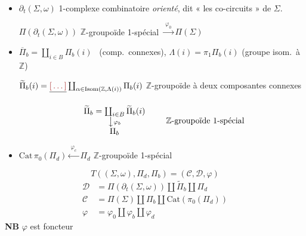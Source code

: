 \documentclass[11pt,a4paper]{article}
\begin{document}
\begin{itemize}
  \item[(a')] $\partial_t(\Sigma, \omega)$ 1-complexe combinatoire
  \struck{\ill{}} \emph{orienté}, dit « les co-circuits » de $\Sigma$.

  $\Pi(\partial_t(\Sigma, \omega))$ \quad $\mathbb{Z}$-groupoïde 1-spécial
  $\xrightarrow{\ \varphi_0\ } \Pi(\Sigma)$

  \item[(b')]
  $\overline{\Pi}_b = \coprod_{i \in B} \Pi_b(i)$ \ (comp.\ connexes),
  \quad $\Lambda(i) = \pi_1 \Pi_b(i)$ (groupe isom.\ à $\mathbb{Z}$)

  $\widetilde{\Pi}_b(i) = \struck{\ill{}} \coprod_{\alpha \in \mathrm{Isom}(\mathbb{Z}, \Lambda(i))}
  \Pi_b(i)$ \quad $\mathbb{Z}$-groupoïde  à deux
  composantes connexes

  \[
    \begin{array}{c}
      \widetilde{\Pi}_b = \coprod_{i \in B} \widetilde{\Pi}_b(i) \\
      \big\downarrow \scriptstyle \varphi_b \\
      \Pi_b
    \end{array}
    \qquad \mathbb{Z}\text{-groupoïde 1-spécial}
  \]

  \item[(c')] $\mathrm{Cat}\, \pi_0(\Pi_d) \xleftarrow{\ \varphi_c\ } \Pi_d$
  \quad $\mathbb{Z}$-groupoïde 1-spécial
\end{itemize}

\[
  T((\Sigma, \omega), \Pi_d, \Pi_b) = (\mathcal{C}, \mathcal{D}, \varphi)
\]
\[
  \begin{aligned}
    \mathcal{D} &= \Pi(\partial_t(\Sigma, \omega)) \amalg \widetilde{\Pi}_b \amalg \Pi_d \\
    \mathcal{C} &= \Pi(\Sigma) \amalg \Pi_b \amalg \mathrm{Cat}(\pi_0(\Pi_d)) \\
    \varphi &= \varphi_0 \amalg \varphi_b \amalg \varphi_d
  \end{aligned}
\]
\textbf{NB} $\varphi$ est foncteur 

\end{document}
